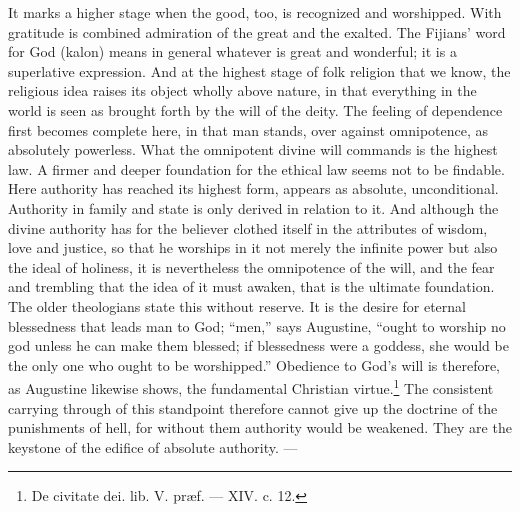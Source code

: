 \documentclass[12pt,a4paper,openany]{book}
\newcommand{\opage}[1]{\marginnote{\footnotesize\textit{[#1]}}}
\begin{document}
It marks a higher stage when the good, too, is recognized and worshipped. With
gratitude is combined admiration of the great and the exalted. The Fijians'
word for God (kalon) means in general whatever is great and wonderful; it is a
superlative expression. And at the highest stage of folk religion that we
know, the religious idea raises its object wholly above nature, in that
everything in the world is seen as brought forth by the will of the deity. The
feeling of dependence first becomes complete here, in that man stands, over
against omnipotence, as absolutely powerless. What the omnipotent divine will
commands is the highest law. A firmer and deeper foundation for the ethical
law seems not to be findable. Here authority has reached its highest
\opage{67}form, appears as absolute, unconditional. Authority in family and
state is only derived in relation to it. And although the divine authority has
for the believer clothed itself in the attributes of wisdom, love and justice,
so that he worships in it not merely the infinite power but also the ideal of
holiness, it is nevertheless the omnipotence of the will, and the fear and
trembling that the idea of it must awaken, that is the ultimate foundation.
The older theologians state this without reserve. It is the desire for eternal
blessedness that leads man to God; ``men,'' says Augustine, ``ought to worship
no god unless he can make them blessed; if blessedness were a goddess, she
would be the only one who ought to be worshipped.'' Obedience to God's will is
therefore, as Augustine likewise shows, the fundamental Christian
virtue.\footnote[1]{De civitate dei. lib. V. præf. --- XIV. c. 12.} The
consistent carrying through of this standpoint therefore cannot give up the
doctrine of the punishments of hell, for without them authority would be
weakened. They are the keystone of the edifice of absolute authority. ---
\end{document}
